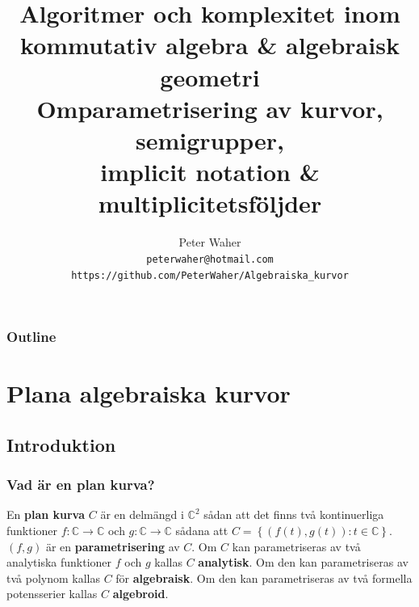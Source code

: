 \documentclass{beamer}
\title[Algoritmer och komplexitet inom algebraisk geometri]{
	Algoritmer och komplexitet inom \\
	kommutativ algebra \& algebraisk geometri \\[20pt]
	\large Omparametrisering av kurvor, semigrupper, \\
	implicit notation \& multiplicitetsföljder}
\author[Peter Waher]{Peter Waher \\[10pt]
	\texttt{peterwaher@hotmail.com}\\
	\texttt{https://github.com/PeterWaher/Algebraiska\_kurvor}}
\begin{document}
\begin{frame}
	\titlepage
\end{frame}

\begin{frame}
	\frametitle{Outline}
	\tableofcontents[pausesections]
\end{frame}

\section{Plana algebraiska kurvor}
\subsection{Introduktion}

\begin{frame}
\frametitle{Vad är en plan kurva?}
\begin{Definition}
	En \textbf{plan kurva} $C$ är en delmängd i $\mathbb{C}^2$ sådan att det finns två kontinuerliga funktioner $f : \mathbb{C} \rightarrow \mathbb{C}$ och 
	$g : \mathbb{C} \rightarrow \mathbb{C}$ sådana att $C = \left\{\left(f(t), g(t)\right) : t \in \mathbb{C}\right\}$. $(f, g)$ är en \textbf{parametrisering} av $C$. Om $C$ kan parametriseras av två analytiska funktioner $f$ och $g$ kallas $C$ \textbf{analytisk}. Om den kan parametriseras av två polynom kallas $C$ för \textbf{algebraisk}. Om den kan parametriseras av två formella potensserier kallas $C$ \textbf{algebroid}.
\end{Definition}
\end{frame}
\end{document}

